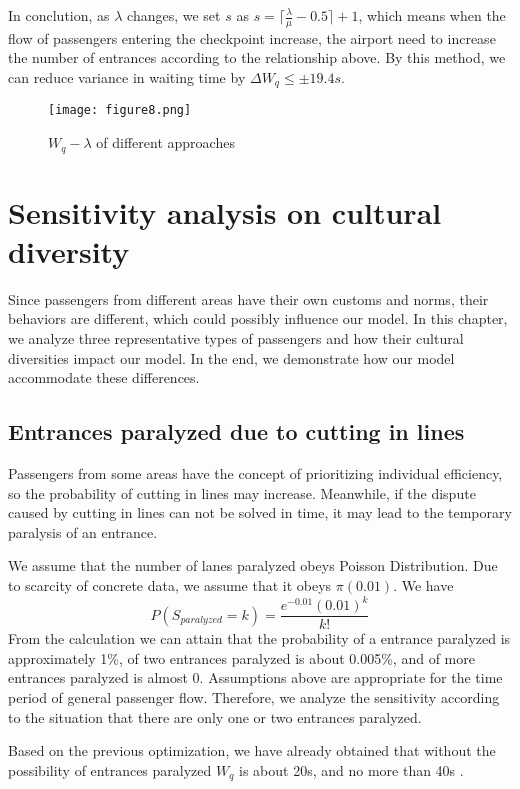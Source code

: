 \documentclass{mcmthesis}
\begin{document}
In conclution, as $\lambda$ changes, we set $s$ as $s=\lceil\frac{\lambda}{\mu}-0.5\rceil+1$, which means when the flow of passengers entering the checkpoint increase, the airport need to increase the number of entrances according to the relationship above. By this method, we can reduce variance in waiting time by $\Delta W_q \leq \pm19.4s$.
\begin{figure}[H]
\small
\centering
\texttt{[image: figure8.png]}
\caption{$W_q-\lambda$ of different approaches} \label{fig:8}
\end{figure}
\section{Sensitivity analysis on cultural diversity}
Since passengers from different areas have their own customs and norms, their behaviors are different, which could possibly influence our model. In this chapter, we analyze three representative types of passengers and how their cultural diversities impact our model. In the end, we demonstrate how our model accommodate these differences. 
\subsection{Entrances paralyzed due to cutting in lines}
Passengers from some areas have the concept of prioritizing individual efficiency, so the probability of cutting in lines may increase. Meanwhile, if the dispute caused by cutting in lines can not be solved in time, it may lead to the temporary paralysis of an entrance.

We assume that the number of lanes paralyzed obeys Poisson Distribution. Due to scarcity of concrete data, we assume that it obeys $\pi(0.01)$. We have
$$P(S_{paralyzed}=k)=\frac{e^{-0.01}(0.01)^k}{k!}$$
From the calculation we can attain that the probability of a entrance paralyzed is approximately 1\%, of two entrances paralyzed is about 0.005\%, and of more entrances paralyzed is almost 0. Assumptions above are appropriate for the time period of general passenger flow. Therefore, we analyze the sensitivity according to the situation that there are only one or two entrances paralyzed.

Based on the previous optimization, we have already obtained that without the possibility of entrances paralyzed $W_q$ is about 20s, and no more than 40s .
\end{document}
